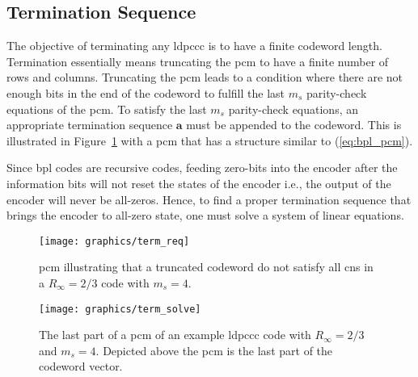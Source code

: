 \subsection{Termination Sequence}\label{sec:bpl_termi}
The objective of terminating any \ac{ldpccc} is to have a finite codeword length. Termination essentially means truncating the \ac{pcm} to have a finite number of rows and columns. Truncating the \ac{pcm} leads to a condition where there are not enough bits in the end of the codeword to fulfill the last $m_s$ parity-check equations of the \ac{pcm}. To satisfy the last $m_s$ parity-check equations, an appropriate termination sequence $\mathbf{a}$ must be appended to the codeword. This is illustrated in Figure~\ref{fig:term_req} with a \ac{pcm} that has a structure similar to (\ref{eq:bpl_pcm}).

Since \ac{bpl} codes are recursive codes, feeding zero-bits into the encoder after the information bits will not reset the states of the encoder i.e., the output of the encoder will never be all-zeros. Hence, to find a proper termination sequence that brings the encoder to all-zero state, one must solve a system of linear equations.

\begin{figure}[htbp]
  \centering
  \texttt{[image: graphics/term\_req]}
  \caption{\ac{pcm} illustrating that a truncated codeword do not satisfy all \acp{cn} in a $R_\infty=2/3$ code with $m_s=4$.}
  \label{fig:term_req}
\end{figure}

\begin{figure}[htbp]
  \centering
  \texttt{[image: graphics/term\_solve]}
  \caption{The last part of a \ac{pcm} of an example \ac{ldpccc} code with $R_\infty=2/3$ and $m_s=4$. Depicted above the \ac{pcm} is the last part of the codeword vector.}
  \label{fig:bpl_term}
\end{figure}

